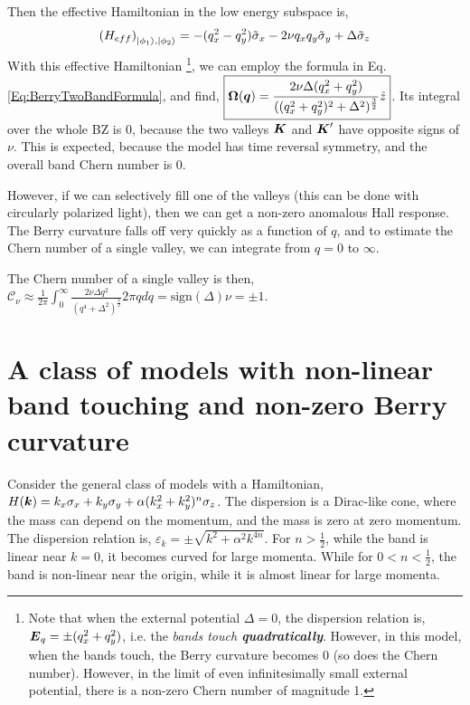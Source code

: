 \documentclass{report}
\renewcommand\vec[1]{\ensuremath\boldsymbol{#1}} %
\begin{document}
Then the effective Hamiltonian in the low energy subspace is,
\begin{equation}\label{Eq:EffectiveLowEnergyTwoBandHamiltonian}
	\left(H_{eff}\right)_{\ket{\phi_1}, \ket{\phi_2}} = -(q_x^2 - q_y^2) \tilde{\sigma}_x - 2 \nu q_x q_y \tilde{\sigma}_y + \Delta \tilde{\sigma}_z 
\end{equation}
With this effective Hamiltonian \footnote{Note that when the external potential $\Delta = 0$, the dispersion relation is, $\vec{E}_q = \pm (q_x^2 + q_y^2)$, i.e. the \textit{bands touch \textbf{quadratically}}. However, in this model, when the bands touch, the Berry curvature becomes 0 (so does the Chern number). However, in the limit of even infinitesimally small external potential, there is a non-zero Chern number of magnitude 1.}, we can employ the formula in Eq. \eqref{Eq:BerryTwoBandFormula}, and find, $\boxed{\vec{\Omega}(\vec{q}) = \frac{2 \nu \Delta (q_x^2 + q_y^2)}{((q_x^2 + q_y^2)^2 + \Delta^2)^{\frac{3}{2}}}    \hat{z}}$.
Its integral over the whole BZ is 0, because the two valleys $\vec{K}$ and $\vec{K}'$ have opposite signs of $\nu$. This is expected, because the model has time reversal symmetry, and the overall band Chern number is 0.


However, if we can selectively fill one of the valleys (this can be done with circularly polarized light), then we can get a non-zero anomalous Hall response. The Berry curvature falls off very quickly as a function of $q$, and to estimate the Chern number of a single valley, we can integrate from $q = 0$ to $\infty$.

The Chern number of a single valley is then, $\boxed{\mathcal{C}_{\nu} \approx \frac{1}{2\pi} \int_0^{\infty} \frac{2 \nu \Delta q^2}{(q^4 + \Delta^2)^{\frac{3}{2}}} 2 \pi q dq = \text{sign}(\Delta) \nu = \pm 1}$.

\section{A class of models with non-linear band touching and non-zero Berry curvature}

Consider the general class of models with a Hamiltonian,
$H(\vec{k}) = k_x \sigma_x + k_y \sigma_y + \alpha (k_x^2 + k_y^2)^n \sigma_z$. The dispersion is a Dirac-like cone, where the mass can depend on the momentum, and the mass is zero at zero momentum.
The dispersion relation is, $\varepsilon_k = \pm \sqrt{k^2 + \alpha^2 k^{4n}}$. For $n > \frac{1}{2}$, while the band is linear near $k = 0$, it becomes curved for large momenta. While for $0<n<\frac{1}{2}$, the band is non-linear near the origin, while it is almost linear for large momenta.
\end{document}

